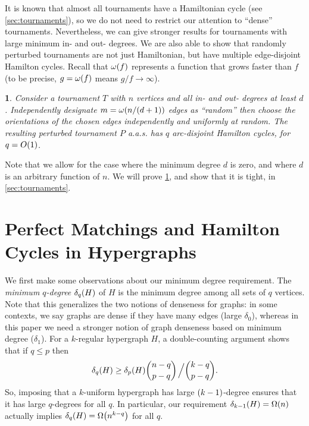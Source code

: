\documentclass[11pt,english]{article}
\theoremstyle{plain}
\newtheorem{thm}{\protect\theoremname}
\theoremstyle{definition}
\theoremstyle{definition}
\theoremstyle{plain}
\theoremstyle{plain}
\theoremstyle{plain}
\theoremstyle{plain}
\theoremstyle{remark}
\theoremstyle{remark}
\let\originalleft\left
\let\originalright\right
\renewcommand{\left}{\mathopen{}\mathclose\bgroup\originalleft}
\renewcommand{\right}{\aftergroup\egroup\originalright}
\providecommand{\theoremname}{Theorem}
\begin{document}
It is known that almost all tournaments have a Hamiltonian cycle (see
\ref{sec:tournaments}), so we do not need to restrict our attention
to ``dense'' tournaments. Nevertheless, we can give stronger results
for tournaments with large minimum in- and out- degrees. We are also
able to show that randomly perturbed tournaments are not just Hamiltonian,
but have multiple edge-disjoint Hamilton cycles. Recall that $\omega\left(f\right)$ represents a function that grows faster than $f$ (to be precise, $g=\omega\left(f\right)$ means $g/f\to\infty$).
\begin{thm}
\label{thm:tournament}Consider a tournament $T$ with $n$ vertices
and all in- and out- degrees at least $d$. Independently designate
$m=\omega\left(n/\left(d+1\right)\right)$ edges as ``random'' then choose the
orientations of the chosen edges independently and uniformly at random.
The resulting perturbed tournament $P$ a.a.s. has $q$ arc-disjoint
Hamilton cycles, for $q=O\left(1\right)$.
\end{thm}

Note that we allow for the case where the minimum degree $d$ is zero, and where $d$ is an arbitrary function of $n$. We will prove \ref{thm:tournament}, and show that it is tight, in \ref{sec:tournaments}.


\section{\label{sec:hypergraphs}Perfect Matchings and Hamilton Cycles in
Hypergraphs}

We first make some observations about our minimum degree requirement.
The \emph{minimum $q$-degree} $\delta_{q}\left(H\right)$ of $H$
is the minimum degree among all sets of $q$ vertices. Note that this
generalizes the two notions of denseness for graphs: in some contexts,
we say graphs are dense if they have many edges (large $\delta_{0}$),
whereas in this paper we need a stronger notion of graph denseness
based on minimum degree ($\delta_{1}$). For a $k$-regular hypergraph
$H$, a double-counting argument shows that if $q\le p$ then
\[
\delta_{q}\left(H\right)\ge\delta_{p}\left(H\right){n-q \choose p-q}\left.\vphantom{\sum}\right/{k-q \choose p-q}.
\]
So, imposing that a $k$-uniform hypergraph has large $\left(k-1\right)$-degree
ensures that it has large $q$-degrees for all $q$. In particular,
our requirement $\delta_{k-1}\left(H\right)=\Omega\left(n\right)$
actually implies $\delta_{q}\left(H\right)=\Omega\left(n^{k-q}\right)$
for all $q$.
\end{document}
